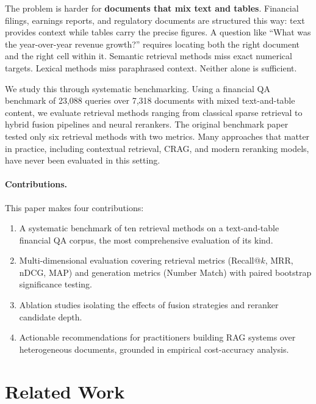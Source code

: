 \documentclass[11pt]{article}
\begin{document}
The problem is harder for \textbf{documents that mix text and tables}. Financial filings, earnings reports, and regulatory documents are structured this way: text provides context while tables carry the precise figures. A question like ``What was the year-over-year revenue growth?'' requires locating both the right document and the right cell within it. Semantic retrieval methods miss exact numerical targets. Lexical methods miss paraphrased context. Neither alone is sufficient.

We study this through systematic benchmarking. Using a financial QA benchmark of 23,088 queries over 7,318 documents with mixed text-and-table content, we evaluate retrieval methods ranging from classical sparse retrieval to hybrid fusion pipelines and neural rerankers. The original benchmark paper tested only six retrieval methods with two metrics. Many approaches that matter in practice, including contextual retrieval, CRAG, and modern reranking models, have never been evaluated in this setting.

\paragraph{Contributions.} This paper makes four contributions:
\begin{enumerate}
    \item A systematic benchmark of ten retrieval methods on a text-and-table financial QA corpus, the most comprehensive evaluation of its kind.
    \item Multi-dimensional evaluation covering retrieval metrics (Recall@$k$, MRR, nDCG, MAP) and generation metrics (Number Match) with paired bootstrap significance testing.
    \item Ablation studies isolating the effects of fusion strategies and reranker candidate depth.
    \item Actionable recommendations for practitioners building RAG systems over heterogeneous documents, grounded in empirical cost-accuracy analysis.
\end{enumerate}

\section{Related Work}
\label{sec:related}
\end{document}
